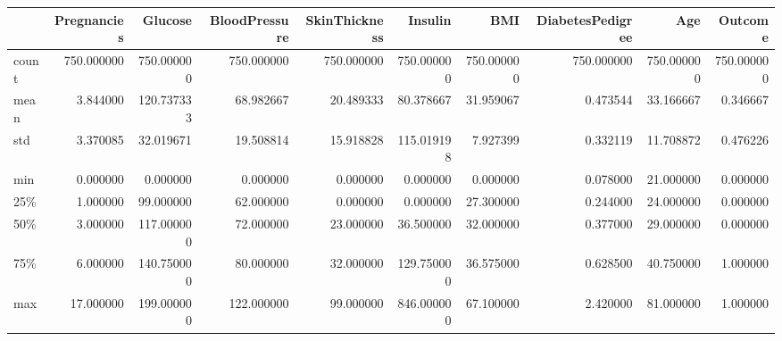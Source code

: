 \begin{tabular}{lrrrrrrrrr}
\toprule
{} &  Pregnancies &     Glucose &  BloodPressure &  SkinThickness &     Insulin &         BMI &  DiabetesPedigree &         Age &     Outcome \\
\midrule
count &   750.000000 &  750.000000 &     750.000000 &     750.000000 &  750.000000 &  750.000000 &        750.000000 &  750.000000 &  750.000000 \\
mean  &     3.844000 &  120.737333 &      68.982667 &      20.489333 &   80.378667 &   31.959067 &          0.473544 &   33.166667 &    0.346667 \\
std   &     3.370085 &   32.019671 &      19.508814 &      15.918828 &  115.019198 &    7.927399 &          0.332119 &   11.708872 &    0.476226 \\
min   &     0.000000 &    0.000000 &       0.000000 &       0.000000 &    0.000000 &    0.000000 &          0.078000 &   21.000000 &    0.000000 \\
25\%   &     1.000000 &   99.000000 &      62.000000 &       0.000000 &    0.000000 &   27.300000 &          0.244000 &   24.000000 &    0.000000 \\
50\%   &     3.000000 &  117.000000 &      72.000000 &      23.000000 &   36.500000 &   32.000000 &          0.377000 &   29.000000 &    0.000000 \\
75\%   &     6.000000 &  140.750000 &      80.000000 &      32.000000 &  129.750000 &   36.575000 &          0.628500 &   40.750000 &    1.000000 \\
max   &    17.000000 &  199.000000 &     122.000000 &      99.000000 &  846.000000 &   67.100000 &          2.420000 &   81.000000 &    1.000000 \\
\bottomrule
\end{tabular}
